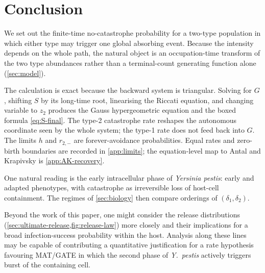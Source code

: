 \section{Conclusion}
\label{sec:conclusion}

We set out the finite-time no-catastrophe probability for a two-type population in which either type may trigger one global absorbing event. Because the intensity depends on the whole path, the natural object is an occupation-time transform of the two type abundances rather than a terminal-count generating function alone (\cref{sec:model}).

The calculation is exact because the backward system is triangular. Solving for $G$, shifting $S$ by its long-time root, linearising the Riccati equation, and changing variable to $z_2$ produces the Gauss hypergeometric equation and the boxed formula \cref{eq:S-final}. The type-2 catastrophe rate reshapes the autonomous coordinate seen by the whole system; the type-1 rate does not feed back into $G$. The limits $h$ and $r_{2,-}$ are forever-avoidance probabilities. Equal rates and zero-birth boundaries are recorded in \cref{app:limits}; the equation-level map to Antal and Krapivsky is \cref{app:AK-recovery}.

One natural reading is the early intracellular phase of \textit{Yersinia pestis}: early and adapted phenotypes, with catastrophe as irreversible loss of host-cell containment. The regimes of \cref{sec:biology} then compare orderings of $(\delta_1,\delta_2)$.

Beyond the work of this paper, one might consider the release distributions (\cref{sec:ultimate-release,fig:release-law}) more closely and their implications for a broad infection-success probability within the host. Analysis along these lines may be capable of contributing a quantitative justification for a rate hypothesis favouring MAT/GATE in which the second phase of \textit{Y.\ pestis} actively triggers burst of the containing cell.
